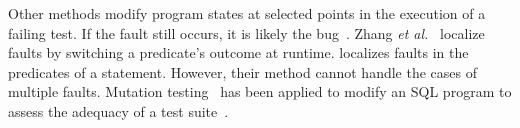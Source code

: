 

Other methods modify program states at selected points in the
execution of a failing test. If the fault still occurs, it is likely
the bug~\cite{cleve-icse05,zhang-icse06,jeffrey-issta08}.  Zhang {\em
et al.}~\cite{zhang-icse06} localize faults by switching a predicate's
outcome at runtime. 
{\tool} localizes faults in the predicates of
a  statement. 
However, their method cannot handle the cases of multiple faults.
Mutation testing~\cite{andrews06} has been applied to modify
an SQL program to assess the adequacy of a test suite~\cite{tuya07}.



